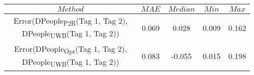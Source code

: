 \begin{table}[h]
\centering
{\small
\begin{tabular}{|c|c|c|c|c|}
\hline
$Method$ & $MAE$ & $Median$ & $Min$ & $Max$ \\
\hline
{\scriptsize Error(DPeople\textsubscript{P2R}(Tag 1, Tag 2), DPeople\textsubscript{UWB}(Tag 1, Tag 2))} & 0.069 & 0.028 & 0.009 & 0.162 \\
\hline
{\scriptsize Error(DPeople\textsubscript{Opt}(Tag 1, Tag 2), DPeople\textsubscript{UWB}(Tag 1, Tag 2))} & 0.083 & -0.055 & 0.015 & 0.198 \\
\hline
\end{tabular}
}
\end{table}
